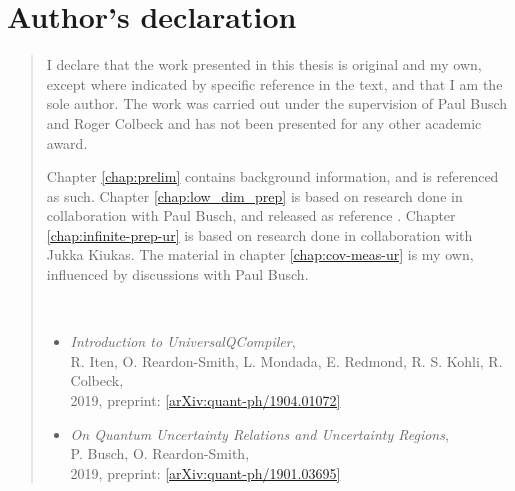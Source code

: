 %
%
%
%
%
%
\chapter*{Author's declaration}
\begin{SingleSpace}
\begin{quote}

I declare that the work presented in this thesis is original and my own, except where indicated by specific reference in the text, and that I am the sole author. The work was carried out under the supervision of Paul Busch and Roger Colbeck and has not been presented for any other academic award.

Chapter \ref{chap:prelim} contains background information, and is referenced as such. Chapter \ref{chap:low_dim_prep} is based on research done in collaboration with Paul Busch, and released as reference \cite{pb-ors-u-regions-u-relations}. Chapter \ref{chap:infinite-prep-ur} is based on research done in collaboration with Jukka Kiukas. The material in chapter \ref{chap:cov-meas-ur} is my own, influenced by discussions with Paul Busch.

\bigskip

\bigskip

\bigskip

\bigskip

\bigskip

\\

\begin{itemize}
\item {\em Introduction to UniversalQCompiler}, \\ R. Iten, O. Reardon-Smith, L. Mondada, E. Redmond, R. S. Kohli, R. Colbeck, \\2019, preprint: \href{https://arxiv.org/abs/1904.01072}{[arXiv:quant-ph/1904.01072]}
\item {\em On Quantum Uncertainty Relations and Uncertainty Regions}, \\P. Busch, O. Reardon-Smith, \\2019, preprint: \href{https://arxiv.org/abs/1901.03695}{[arXiv:quant-ph/1901.03695]}
\end{itemize}


\end{quote}
\end{SingleSpace}
\clearpage